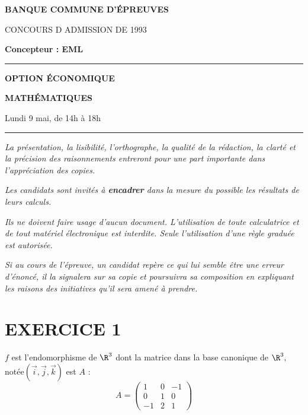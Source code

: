 \documentclass[11pt]{article}%
\begin{document}

\begin{center}
{\LARG\E\textbf{BANQUE COMMUNE D'ÉPREUVES}}



{\large \textsc{CONCOURS D ADMISSION DE 1993}}



{\large \textbf{Concepteur : EML}}



\rule{2.39cm}{0.05cm}



{\Large \textbf{OPTION ÉCONOMIQUE}}



{\Large \textbf{MATHÉMATIQUES }}



{\Large Lundi 9 mai, de 14h à 18h}



\rule{2.39cm}{0.05cm}
\end{center}

\textit{La présentation, la lisibilité, l'orthographe, la qualité
de la rédaction, la clarté et la précision des raisonnements
entreront pour une part importante dans l'appréciation des copies.}

\textit{Les candidats sont invités à \textbf{encadrer} dans la mesure
du possible les résultats de leurs calculs.}

\textit{Ils ne doivent faire usage d'aucun document. L'utilisation de
toute
calculatrice et de tout matériel électronique est interdite. Seule
l'utilisation d'une règle graduée est autorisée.}

\textit{Si au cours de l'épreuve, un candidat repère ce qui lui semble
être une erreur d'énoncé, il la signalera sur sa copie et
poursuivra sa composition en expliquant les raisons des initiatives
qu'il sera
amené à prendre.}

\vspace*{3cm}

\section*{EXERCICE 1}

$f$ est l'endomorphisme de $\R^{3}$ dont la matrice dans la base
canonique de $\R^{3},$ notée$\left( \vec{i},\vec{j},\vec{k}\right) $
est $A$ : 
\[
A = \left( 
\begin{array}{rrr}
1 & 0 & -1 \\
0 & 1 & 0 \\
-1 & 2 & 1
\end{array}
\right)
\]
\end{document}
